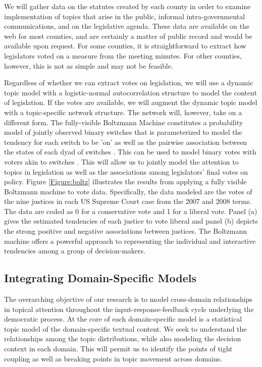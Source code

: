 We will gather data on the statutes created by each county in order to examine implementation of topics that arise in the public, informal intra-governmental communications, and on the legislative agenda. These data are available on the web for most counties, and are certainly a matter of public record and would be available upon request. For some counties, it is straightforward to extract how legislators voted on a measure from the meeting minutes. For other counties, however, this is not as simple and may not be feasible. 

Regardless of whether we can extract votes on legislation, we will use a dynamic topic model with a logistic-normal autocorrelation structure  to model the content of legislation. If the votes are available, we will augment the dynamic topic model with a topic-specific network structure. The network will, however, take on a different form. The fully-visible Boltzmann Machine constitutes a probability model of jointly observed binary switches that is parameterized to model the tendency for each switch to be 'on' as well as the pairwise association between the states of each dyad of switches \cite{Gunawardana2008}. This can be used to model binary votes with voters akin to switches \cite{Desmarais2010}. This will allow us to jointly model the attention to topics in legislation as well as the associations among legislators' final votes on policy. Figure \ref{Figure:boltz} illustrates the results from applying a fully visible Boltzmann machine to vote data. Specifically, the data modeled are the votes of the nine justices in each US Supreme Court case from the 2007 and 2008 terms. The data are coded as 0 for a conservative vote and 1 for a liberal vote. Panel (a) gives the estimated tendencies of each justice to vote liberal and panel (b) depicts the strong positive and negative associations between justices. The Boltzmann machine offers a powerful approach to representing the individual and interactive tendencies among a group of decision-makers.


\subsection{Integrating Domain-Specific Models}

The overarching objective of our research is to model cross-domain relationships in topical attention throughout the input-response-feedback cycle underlying the democratic process. At the core of each domain-specific model is a statistical topic model of the domain-specific textual content. We seek to understand the relationships among the topic distributions, while also modeling the decision context in each domain. This will permit us to identify the points of tight coupling as well as breaking points in topic movement across domains.

